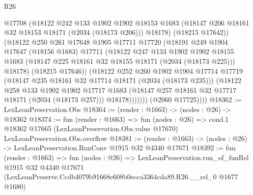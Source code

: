 \begin{lexlean}{R26}
\begin{coremodule}
                    @17708
                    (@18122
                      @242
                      @133
                      @1902
                      @1902
                      @18153
                      @1683
                      (@18147 @206 @18161 @32 @18153 @18171 (@2034 (@18173 @206)))
                      @18178)
                    (@18215 @17642))
                  (@18122
                    @250
                    @261
                    @17648
                    @1905
                    @17711
                    @17720
                    (@18191
                      @249
                      @1904
                      @17647
                      (@18156 @1683)
                      @17711
                      (@18122
                        @247
                        @133
                        @1902
                        @1902
                        @18155
                        @1683
                        (@18147 @225 @18161 @32 @18155 @18171 (@2034 (@18173 @225)))
                        @18178)
                      (@18215 @17646))
                    (@18122
                      @252
                      @260
                      @1902
                      @1904
                      @17714
                      @17719
                      (@18147 @235 @18161 @32 @17714 @18171 (@2034 (@18173 @235)))
                      (@18122
                        @258
                        @133
                        @1902
                        @1902
                        @17717
                        @1683
                        (@18147 @257 @18161 @32 @17717 @18171 (@2034 (@18173 @257)))
                        @18178)))))))
          (@2060 @17725))))
@18362 := LexLeanPreservation.Obs
@18364 := (render : @1663) -> (nodes : @26) -> @18362
@18374 := fun (render : @1663) =>
  fun (nodes : @26) =>
  cond.{1} @18362 @17665 (LexLeanPreservation.Obs.value @17670) LexLeanPreservation.Obs.overflow
@18381 := (render : @1663) -> (nodes : @26) -> LexLeanPreservation.RunConv @1915 @32 @4340 @17671
@18392 := fun (render : @1663) =>
  fun (nodes : @26) =>
  LexLeanPreservation.run_of_funRel
    @1915
    @32
    @4340
    @17671
    (LexLeanPreserve.Ccdb4079b91668e608b0ecca3364cda89.R26.__rel_0 @1677 @1680)
\end{coremodule}
\end{lexlean}
